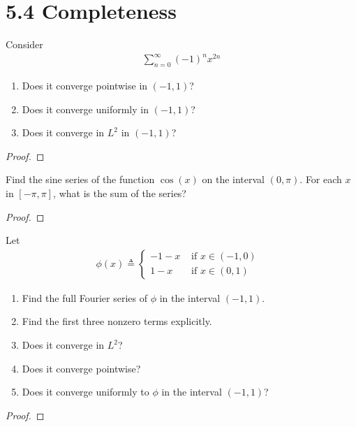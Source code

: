 \documentclass{report}
\begin{document}
\section{5.4 Completeness}
\begin{question}{}{}
Consider 
\begin{align*}
\sum_{n=0}^{\infty}(-1)^n x^{2n}
\end{align*}
\begin{enumerate}[label=(\alph*)]
  \item Does it converge pointwise in $(-1,1)$?  
  \item Does it converge uniformly in $(-1,1)$? 
  \item Does it converge in $L^2$ in $(-1,1)$? 
\end{enumerate}
\end{question}
\begin{proof}

\end{proof}
\begin{question}{}{}
Find the sine series of the function $\cos (x)$ on the interval $(0,\pi )$. For each $x$ in $[-\pi ,\pi ]$, what is the sum of the series?  
\end{question}
\begin{proof}

\end{proof}
\begin{question}{}{}
Let 
\begin{align*}
\phi (x)\triangleq \begin{cases}
  -1-x& \text{ if $x\in (-1,0)$ }\\
  1-x& \text{ if $x\in (0,1)$ }
\end{cases}
\end{align*}
\begin{enumerate}[label=(\alph*)]
  \item Find the full Fourier series of $\phi$ in the interval $(-1,1)$. 
  \item Find the first three nonzero terms explicitly. 
  \item Does it converge in $L^2$?  
  \item Does it converge pointwise? 
  \item Does it converge uniformly to $\phi$ in the interval $(-1,1)$? 
\end{enumerate}
\end{question}
\begin{proof}

\end{proof}
\end{document}
